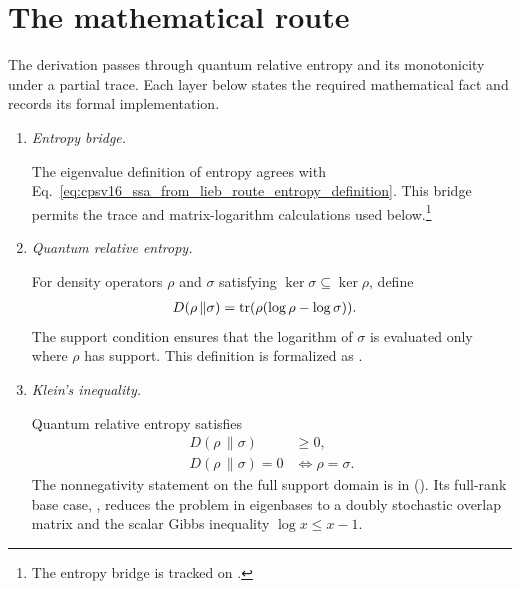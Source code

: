 \documentclass[11pt]{article}
\begin{document}
\section{The mathematical route}

The derivation passes through quantum relative entropy and its monotonicity
under a partial trace. Each layer below states the required mathematical fact
and records its formal implementation.

\begin{enumerate}
    \item \emph{Entropy bridge.}

    The eigenvalue definition of entropy agrees with
    Eq.~\ref{eq:cpsv16_ssa_from_lieb_route_entropy_definition}. This bridge
    permits the trace and matrix-logarithm calculations used below.\footnote{The
    entropy bridge is tracked on .}

    \item \emph{Quantum relative entropy.}

    For density operators $\rho$ and $\sigma$ satisfying
    $\ker\sigma\subseteq\ker\rho$, define
    \begin{align}
        D(\rho\,\| \sigma)
            &= \operatorname{tr}(\rho(\log\rho-\log\sigma)).
        \label{eq:cpsv16_ssa_from_lieb_route_relative_entropy_definition}
    \end{align}
    The support condition ensures that the logarithm of $\sigma$ is evaluated
    only where $\rho$ has support. This definition is formalized as
    .

    \item \emph{Klein's inequality.}

    Quantum relative entropy satisfies
    \begin{align}
        D(\rho\,\| \sigma)
            &\geq 0,
        \label{eq:cpsv16_ssa_from_lieb_route_klein_nonnegative}\\
        D(\rho\,\| \sigma)=0
            &\Longleftrightarrow \rho=\sigma.
        \label{eq:cpsv16_ssa_from_lieb_route_klein_equality}
    \end{align}
    The nonnegativity statement on the full support domain is
     in
    (). Its full-rank base case,
    , reduces the problem in eigenbases
    to a doubly stochastic overlap matrix and the scalar Gibbs inequality
    $\log x\leq x-1$.


\end{enumerate}
\end{document}
